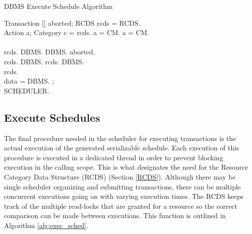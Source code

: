 \documentclass[conference]{IEEEtran}
\begin{document}
\begin{algorithm}
\caption{DBMS Execute Schedule Algorithm}
\label{alg:exec_sched}
\begin{algorithmic}[1]

    \State Transaction [] aborted;
    \State RCDS rcds = RCDS.
    \\
        \State Action a;
            \State Category c = rcds.
            \State a = CM.
        \Else
            \State a = CM.
        \EndIf
        \\
            \State {}
            \\
                \State rcds.
            \EndIf
            \State DBMS.
                \State DBMS.
                \State aborted.
            \EndFor
            \\
                \State rcds.
            \EndIf
            \State DBMS.
        \Else
        \State rcds.
        \State DBMS.
        \EndIf
        \\
            \State rcds.
        \EndIf
    \EndFor
    \\
    \State data = DBMS.
        \State {};\label{l:updatetmetrics}
    \EndFor
    \\
    \State SCHEDULER.
\EndProcedure

\end{algorithmic}
\end{algorithm}

\subsection{Execute Schedules}
The final procedure needed in the scheduler for executing transactions is the actual execution of the generated serializable schedule. Each execution of this procedure is executed in a dedicated thread in order to prevent blocking execution in the calling scope. This is what designates the need for the Resource Category Data Structure (RCDS) (Section \ref{RCDS}). Although there may be single scheduler organizing and submitting transactions, there can be multiple concurrent executions going on with varying execution times. The RCDS keeps track of the multiple read-locks that are granted for a resource so the correct comparison can be made between executions. This function is outlined in Algorithm \ref{alg:exec_sched}.
\end{document}

